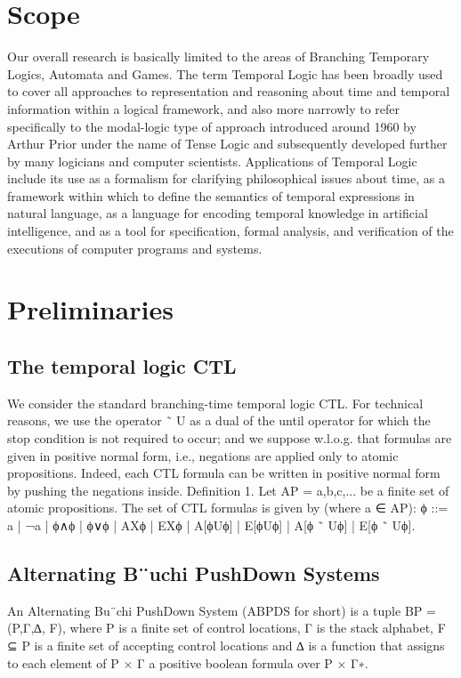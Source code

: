\documentclass[12pt,letterpaper]{article}
\begin{document}
{\section{Scope}
Our overall research is basically limited to the areas of Branching Temporary Logics, Automata and Games. The term Temporal Logic has been broadly used to cover all approaches to representation and reasoning about time and temporal information within a logical framework, and also more narrowly to refer specifically to the modal-logic type of approach introduced around 1960 by Arthur Prior under the name of Tense Logic and subsequently developed further by many logicians and computer scientists. Applications of Temporal Logic include its use as a formalism for clarifying philosophical issues about time, as a framework within which to define the semantics of temporal expressions in natural language, as a language for encoding temporal knowledge in artificial intelligence, and as a tool for specification, formal analysis, and verification of the executions of computer programs and systems.
\section{Preliminaries}

\subsection{The temporal logic CTL}
We consider the standard branching-time temporal logic CTL. For technical reasons, we use the operator ˜ U as a dual of the until operator for which the stop condition is not required to occur; and we suppose w.l.o.g. that formulas are given in positive normal form, i.e., negations are applied only to atomic propositions. Indeed, each CTL formula can be written in positive normal form by pushing the negations inside.
Deﬁnition 1. Let AP = {a,b,c,...} be a ﬁnite set of atomic propositions. The set of CTL formulas is given by (where a ∈ AP):
ϕ ::= a | ¬a | ϕ∧ϕ | ϕ∨ϕ | AXϕ | EXϕ | A[ϕUϕ] | E[ϕUϕ] | A[ϕ ˜ Uϕ] | E[ϕ ˜ Uϕ].
\subsection{Alternating B¨uchi PushDown Systems}
 An Alternating Bu¨chi PushDown System (ABPDS for short) is a tuple BP = (P,Γ,∆, F), where P is a ﬁnite set of control locations, Γ is the stack alphabet, F ⊆ P is a ﬁnite set of accepting control locations and ∆ is a function that assigns to each element of P × Γ a positive boolean formula over P × Γ∗.
}
\end{document}
